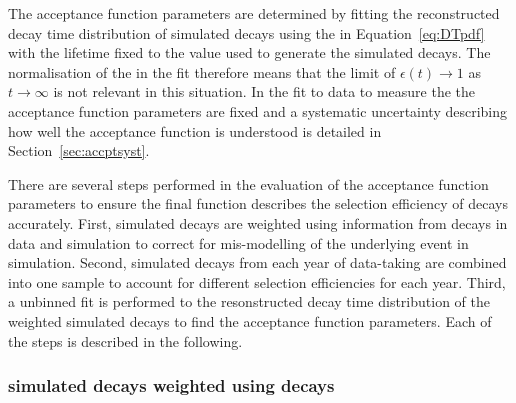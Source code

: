 The acceptance function parameters are determined by fitting the reconstructed decay time distribution of simulated decays using the \pdf in Equation~\ref{eq:DTpdf} with the lifetime fixed to the value used to generate the simulated decays. The normalisation of the \pdf in the fit therefore means that the limit of $\epsilon(t) \rightarrow 1$ as $t \rightarrow \infty$ is not relevant in this situation.
In the fit to data to measure the \el the acceptance function parameters are fixed and a systematic uncertainty describing how well the acceptance function is understood is detailed in Section~\ref{sec:accptsyst}.


There are several steps performed in the evaluation of the acceptance function parameters to ensure the final function describes the selection efficiency of \bsmumu decays accurately.
First, simulated \bsmumu decays are weighted using information from \bdkpi decays in data and simulation to correct for mis-modelling of the underlying event in simulation. Second, simulated \bsmumu decays from each year of data-taking are combined into one sample to account for different selection efficiencies for each year. Third, a unbinned \ml fit is performed to the resonstructed decay time distribution of the weighted simulated decays to find the acceptance function parameters. Each of the steps is described in the following.


\subsubsection*{\boldmath{\bsmumu} simulated decays weighted using \boldmath{\bdkpi} decays}


